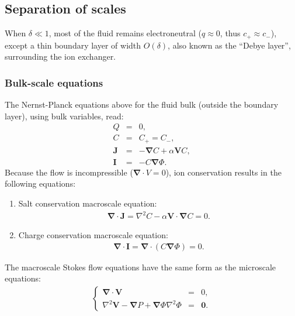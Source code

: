 \documentclass[final]{elsarticle}
\newcommand{\brc}[2]{\left\{\begin{array}{#1}#2\end{array}\right.}
\newcommand{\pars}[1]{\left(#1\right)}
\newcommand\Laplacian{\nabla^2}
\newcommand\bnabla{\boldsymbol{\nabla}}
\newcommand\bV{\boldsymbol{V}}
\newcommand\bI{\boldsymbol{I}}
\newcommand\bJ{\boldsymbol{J}}
\newcommand\bzero{\boldsymbol{0}}
\begin{document}
\subsection{Separation of scales}
When $\delta \ll 1$, 
most of the fluid remains electroneutral ($q \approx 0$, thus $c_+ \approx c_-$), 
except a thin boundary layer of width $O(\delta)$, 
also known as the ``Debye layer'', surrounding the ion exchanger. 

\subsubsection  {Bulk-scale equations}
The Nernst-Planck equations above for the fluid bulk (outside
the boundary layer), using bulk variables, read:
\begin{eqnarray*}
  Q & = & 0, \\
  C & = & C_+ = C_-, \\
\bJ &=& -\bnabla C + \alpha \bV C, \\
\bI &=& -C \bnabla \varPhi.
\end{eqnarray*}
Because the flow is incompressible ($\bnabla \cdot V = 0$), 
ion conservation results in the following equations:

\begin{enumerate}
\item Salt conservation macroscale equation:
\begin{eqnarray*} \label{eq:salt}
\bnabla \cdot \bJ = \Laplacian C - \alpha \bV \cdot \bnabla C = 0. 
\end{eqnarray*}

\item Charge conservation macroscale equation:
\begin{eqnarray*} \label{eq:charge}
\bnabla \cdot \bI = \bnabla \cdot \pars{ C \bnabla \varPhi } = 0.
\end{eqnarray*}

\end{enumerate}

The macroscale Stokes flow equations have the same form as the microscale equations:
\begin{eqnarray*}  \label{eq:stokes}
\brc{rcc}{\bnabla \cdot \bV &=& 0, \\  
\Laplacian \bV - \bnabla P + \bnabla \varPhi \Laplacian \varPhi &=& \bzero.}
\end{eqnarray*}
\end{document}
